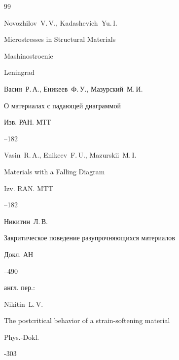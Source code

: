 \begin{thebibliography}{99}


\misctransl

\by Novozhilov~V.\,V., Kadashevich~Yu.\,I.

\book Microstresses in Structural Materials 

\publ Mashinostroenie

\publaddr Leningrad






\by Васин~Р.\,А., Еникеев~Ф.\,У., Мазурский~М.\,И.

\paper О материалах с падающей диаграммой

\jour Изв. РАН. МТТ



--182

\misctransl

\by  Vasin~R.\,A.,  Enikeev~F.\,U.,  Mazurskii~M.\,I.

\paper Materials with a Falling Diagram

\jour Izv. RAN. MTT



--182






\by Никитин~Л.\,В.

\paper Закритическое поведение разупрочняющихся материалов

\jour Докл. АН 




--490

\transl англ. пер.:

\by Nikitin~L.\,V.

\paper The postcritical behavior of a strain-softening material

\jour Phys.-Dokl.




-303








\end{thebibliography}
